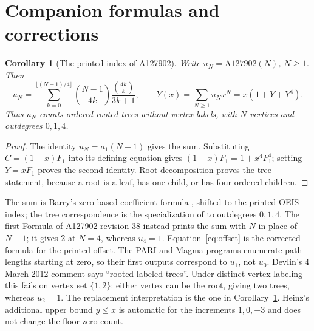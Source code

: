 \documentclass[11pt]{article}
\newtheorem{corollary}[theorem]{Corollary}
\begin{document}
\section{Companion formulas and corrections}\label{sec:siblings}
\begin{corollary}[The printed index of A127902]\label{cor:offset}
Write $u_N=\mathrm{A127902}(N)$, $N\geq1$. Then
\begin{equation}\label{eq:offset}
 u_N=\sum_{k=0}^{\lfloor(N-1)/4\rfloor}
       \binom{N-1}{4k}\frac{\binom{4k}{k}}{3k+1},
 \qquad Y(x)=\sum_{N\geq1}u_Nx^N=x(1+Y+Y^4).
\end{equation}
Thus $u_N$ counts ordered rooted trees without vertex labels, with $N$
vertices and outdegrees $0,1,4$.
\end{corollary}
\begin{proof}
The identity $u_N=a_1(N-1)$ gives the sum. Substituting
$C=(1-x)F_1$ into its defining equation gives
$(1-x)F_1=1+x^4F_1^4$; setting $Y=xF_1$ proves the second identity.
Root decomposition proves the tree statement, because a root is a leaf,
has one child, or has four ordered children.
\end{proof}
The sum is Barry's zero-based coefficient formula
\cite[Example 16, pp.\ 361--362]{barry}, shifted to the printed OEIS index;
the tree correspondence is the specialization of
\cite[Example 3, equation (24)]{bf} to outdegrees $0,1,4$.
The first Formula of A127902 revision 38 instead prints the sum with $N$
in place of $N-1$; it gives $2$ at $N=4$, whereas $u_4=1$.
Equation~\eqref{eq:offset} is the corrected formula for the printed offset.
The PARI and Magma programs enumerate path lengths starting at zero, so
their first outputs correspond to $u_1$, not $u_0$.
Devlin's 4 March 2012 comment says ``rooted labeled trees''.
Under distinct vertex labeling this fails on vertex set $\{1,2\}$:
either vertex can be the root, giving two trees, whereas $u_2=1$.
The replacement interpretation is the one in Corollary~\ref{cor:offset}.
Heinz's additional upper bound $y\leq x$ is automatic for the increments
$1,0,-3$ and does not change the floor-zero count.
\end{document}
